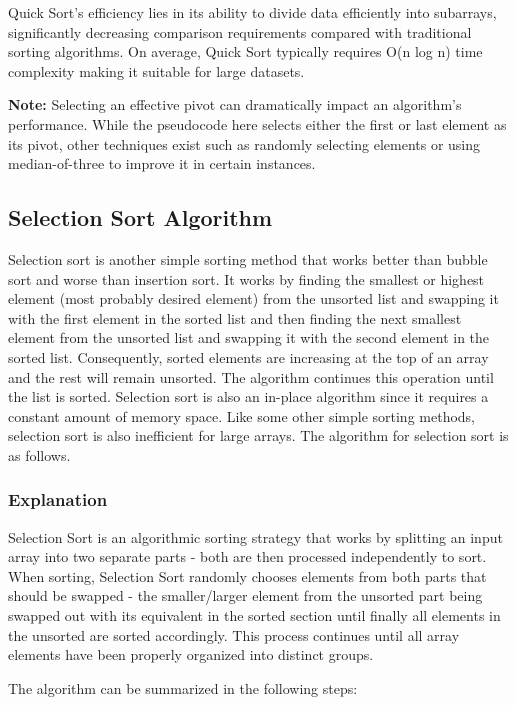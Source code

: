 \documentclass{article}
\begin{document}
Quick Sort's efficiency lies in its ability to divide data efficiently into subarrays, significantly decreasing comparison requirements compared with traditional sorting algorithms. On average, Quick Sort typically requires O(n log n) time complexity making it suitable for large datasets.

\textbf{Note:} Selecting an effective pivot can dramatically impact an algorithm's performance. While the pseudocode here selects either the first or last element as its pivot, other techniques exist such as randomly selecting elements or using median-of-three to improve it in certain instances.

\subsection{Selection Sort Algorithm}

Selection sort is another simple sorting method that works better than bubble sort
and worse than insertion sort. It works by finding the smallest or highest element
(most probably desired element) from the unsorted list and swapping it with the first element in the sorted list and then finding the next smallest element from the unsorted
list and swapping it with the second element in the sorted list. Consequently, sorted elements are increasing at the top of an array and the rest will remain unsorted. The
algorithm continues this operation until the list is sorted. Selection sort is also
an in-place algorithm since it requires a constant amount of memory space. Like
some other simple sorting methods, selection sort is also inefficient for large arrays.
The algorithm for selection sort is as follows.\cite{karunanithi2014survey}


\subsubsection{Explanation}


Selection Sort is an algorithmic sorting strategy that works by splitting an input array into two separate parts - both are then processed independently to sort. When sorting, Selection Sort randomly chooses elements from both parts that should be swapped - the smaller/larger element from the unsorted part being swapped out with its equivalent in the sorted section until finally all elements in the unsorted are sorted accordingly. This process continues until all array elements have been properly organized into distinct groups.

The algorithm can be summarized in the following steps:
\end{document}
